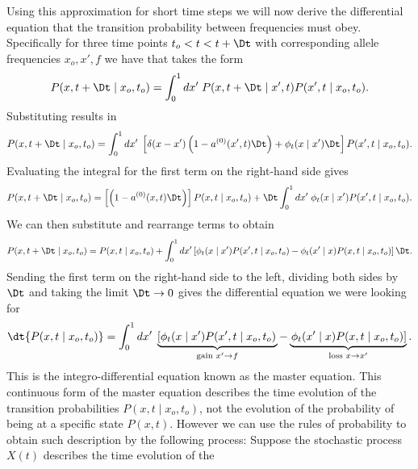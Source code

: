 Using this approximation for short time steps we will now derive the
differential equation that the transition probability between frequencies must
obey. Specifically for three time points $t_o < t < t + \Dt$ with corresponding
allele frequencies $x_o, x', f$ we have that  takes the
form
\begin{equation}
  P(x, t + \Dt \mid x_o, t_o) = \int_0^1 dx' \; P(x, t + \Dt \mid x', t)
  P(x', t \mid x_o, t_o).
\end{equation}
Substituting  results in
\begin{equation}
  P(x, t + \Dt \mid x_o, t_o) = \int_0^1 dx' \;
  \left[ \delta(x - x') \left( 1 - a^{(0)}(x', t)\Dt \right)
  + \phi_t(x \mid x')\Dt \right]
  P(x', t \mid x_o, t_o).
\end{equation}
Evaluating the integral for the first term on the right-hand side gives
\begin{equation}
  P(x, t + \Dt \mid x_o, t_o) = \left[\left( 1 - a^{(0)}(x, t)\Dt \right)\right]
  P(x, t \mid x_o, t_o) +
  \Dt \int_0^1 dx' \; \phi_t(x \mid x') P(x', t \mid x_o, t_o).
\end{equation}
We can then substitute  and rearrange terms to obtain
\begin{equation}
  P(x, t + \Dt \mid x_o, t_o) = P(x, t \mid x_o, t_o)
  + \int_0^1 dx' \left[ \phi_t(x \mid x') P(x', t \mid x_o, t_o) -
  \phi_t(x' \mid x) P(x, t \mid x_o, t_o) \right]\Dt.
\end{equation}
Sending the first term on the right-hand side to the left, dividing both sides
by $\Dt$ and taking the limit $\Dt \rightarrow 0$ gives the differential
equation we were looking for
\begin{equation}
  \dt{P(x, t \mid x_o, t_o)} = \int_0^1 dx' \;
  \underbrace{
  \left[ \phi_t(x \mid x') P(x', t \mid x_o, t_o) \right.}
  _{\text{gain } x' \rightarrow f}  -
  \underbrace{
  \left. \phi_t(x' \mid x) P(x, t \mid x_o, t_o) \right]}
  _{\text{loss } x \rightarrow x'}.
  \label{eq_master_eq_trans}
\end{equation}
This is the integro-differential equation known as the master equation. This
continuous form of the master equation describes the time evolution of the
transition probabilities $P(x, t \mid x_o, t_o)$, not the evolution of the
probability of being at a specific state $P(x, t)$. However we can use the
rules of probability to obtain such description by the following process:
Suppose the stochastic process $X(t)$ describes the time evolution of the

